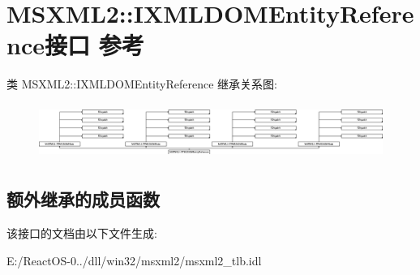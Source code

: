 \hypertarget{interface_m_s_x_m_l2_1_1_i_x_m_l_d_o_m_entity_reference}{}\section{M\+S\+X\+M\+L2\+:\+:I\+X\+M\+L\+D\+O\+M\+Entity\+Reference接口 参考}
\label{interface_m_s_x_m_l2_1_1_i_x_m_l_d_o_m_entity_reference}
类 M\+S\+X\+M\+L2\+:\+:I\+X\+M\+L\+D\+O\+M\+Entity\+Reference 继承关系图\+:\begin{figure}[H]
\begin{center}
\leavevmode
\includegraphics[height=1.834061cm]{interface_m_s_x_m_l2_1_1_i_x_m_l_d_o_m_entity_reference}
\end{center}
\end{figure}
\subsection*{额外继承的成员函数}


该接口的文档由以下文件生成\+:\begin{DoxyCompactItemize}
\item 
E\+:/\+React\+O\+S-\/0../dll/win32/msxml2/msxml2\+\_\+tlb.\+idl\end{DoxyCompactItemize}
